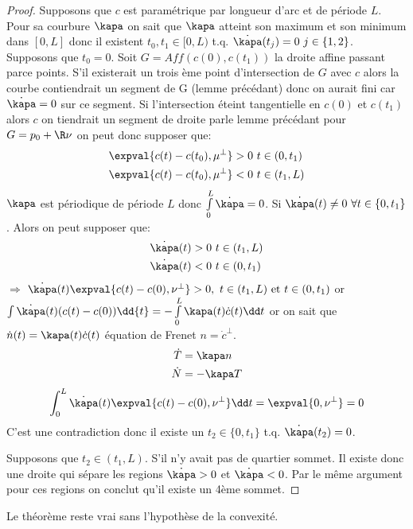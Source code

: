 				\begin{proof}
					Supposons que $c$ est paramétrique par longueur d'arc et de période $L$. Pour sa courbure $\kapa$ on sait que $\kapa$ atteint son maximum et son minimum dans $[0,L]$ donc il existent $t_0,t_1\in[0,L)$ t.q. $\dot\kapa(t_j)=0\ j\in\{1,2\}$. Supposons que $t_0=0$. Soit $G=Aff(c(0),c(t_1))$ la droite affine passant parce points. S'il existerait un trois ème point d'intersection de $G$ avec $c$ alors la courbe contiendrait un segment de G (lemme précédant) donc on aurait fini car $\dot\kapa=0$ sur ce segment. Si l'intersection éteint tangentielle en $c(0)$ et $c(t_1)$ alors $c$ on tiendrait un segment de droite parle lemme précédant pour $G=p_0+\R\nu$ on peut donc supposer que:
					\begin{align}		
						\expval{c(t)-c(t_0),\mu^\perp}>0\ & t\in(0,t_1)\\
						\expval{c(t)-c(t_0),\mu^\perp}<0\ & t\in(t_1,L)
					\end{align}
					$\kapa$ est périodique de période $L$ donc $\int\limits_0^L\dot\kapa=0$. Si $\dot\kapa(t)\neq 0\ \forall t\in\{0,t_1\}$. Alors on peut supposer que:
					\begin{align*}
						\dot\kapa (t)>0\ &t\in(t_1,L)\\
						\dot\kapa (t)<0\ &t\in(0,t_1)
					\end{align*}
					$\Rightarrow$  $\dot\kapa(t)\expval{c(t)-c(0),\nu^\perp}>0,\ t\in(t_1,L)\text{ et }t\in(0,t_1)$ or $\int\dot\kapa(t)(c(t)-c(0))\dd{t}=-\int\limits_0^L\kapa(t)\dot c(t)\dd t$ or on sait que $\dot n(t)=\kapa(t)\dot c(t)$ équation de Frenet $n=\dot c^\perp$.
					\begin{align*}
						\dot T&=\kapa n\\
						\dot N&=-\kapa T
					\end{align*}
					$$\int_0^L\dot\kapa(t)\expval{c(t)-c(0),\nu^\perp}\dd t=\expval{0,\nu^\perp}=0$$
					C'est une contradiction donc il existe un $t_2\in\{0,t_1\}$ t.q. $\dot\kapa(t_2)=0$.

					Supposons que $t_2\in(t_1,L)$. S'il n'y avait pas de quartier sommet. Il existe donc une droite qui sépare les regions $\dot\kapa>0$ et $\dot\kapa<0$. Par le même argument pour ces regions on conclut qu'il existe un 4ème sommet.
				\end{proof}

				\begin{remark}
					Le théorème reste vrai sans l'hypothèse de la convexité.
				\end{remark}


